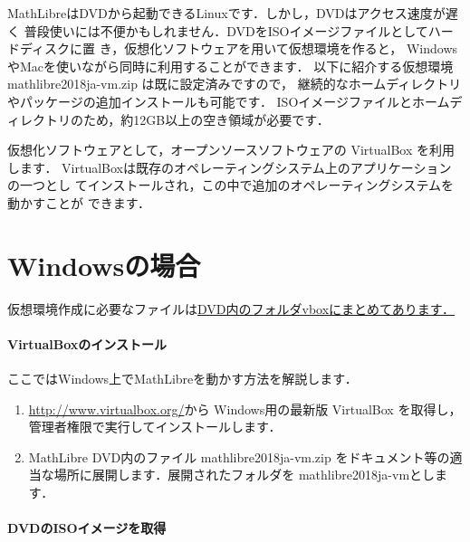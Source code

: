 \documentclass[a4j]{ltjsarticle}
\newcommand{\vboxwin}{VirtualBox-5.2.8-121009-Win.exe}
\newcommand{\vm}{mathlibre2018ja-vm}
\begin{document}
MathLibreはDVDから起動できるLinuxです．しかし，DVDはアクセス速度が遅く
普段使いには不便かもしれません．DVDをISOイメージファイルとしてハードディスクに置
き，仮想化ソフトウェアを用いて仮想環境を作ると，
WindowsやMacを使いながら同時に利用することができます．
以下に紹介する仮想環境 \vm.zip は既に設定済みですので，
継続的なホームディレクトリやパッケージの追加インストールも可能です．
ISOイメージファイルとホームディレクトリのため，約12GB以上の空き領域が必要です．

仮想化ソフトウェアとして，オープンソースソフトウェアの VirtualBox を利用します．
VirtualBoxは既存のオペレーティングシステム上のアプリケーションの一つとし
てインストールされ，この中で追加のオペレーティングシステムを動かすことが
できます．

\section{Windowsの場合}
仮想環境作成に必要なファイルは\underline{DVD内のフォルダvboxにまとめてあります．}\paragraph{VirtualBoxのインストール}
ここではWindows上でMathLibreを動かす方法を解説します．
\begin{enumerate}
 \item %
       \url{http://www.virtualbox.org/}から
       Windows用の最新版 VirtualBox を取得し，管理者権限で実行してインストールします．
 \item MathLibre DVD内のファイル \vm.zip をドキュメント等の適当な場所に展開します．展開されたフォルダを \vm とします．
\end{enumerate}

\paragraph{DVDのISOイメージを取得}
\end{document}
